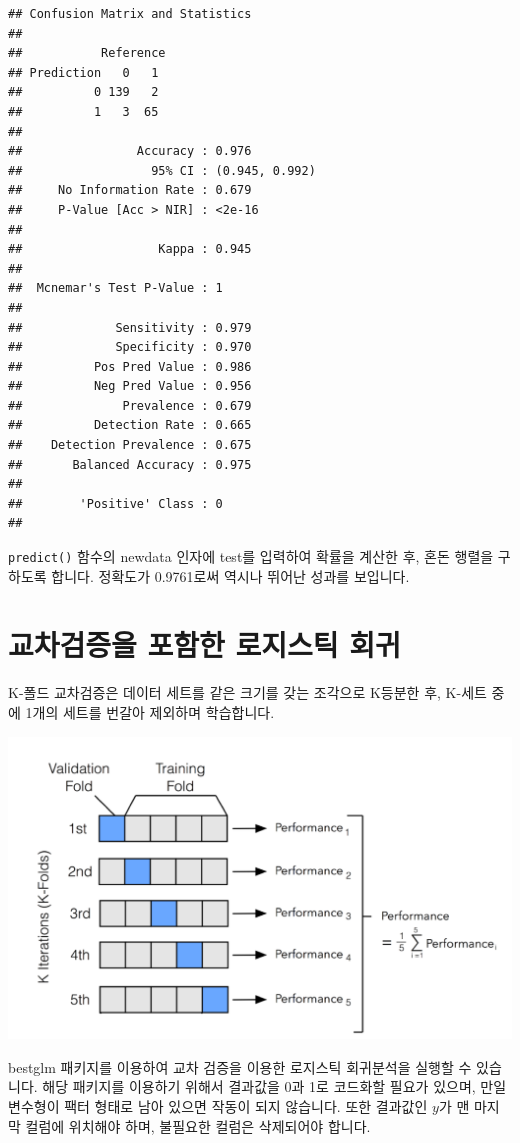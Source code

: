 \documentclass[12pt,]{book}
\begin{document}
\begin{verbatim}
## Confusion Matrix and Statistics
## 
##           Reference
## Prediction   0   1
##          0 139   2
##          1   3  65
##                                         
##                Accuracy : 0.976         
##                  95% CI : (0.945, 0.992)
##     No Information Rate : 0.679         
##     P-Value [Acc > NIR] : <2e-16        
##                                         
##                   Kappa : 0.945         
##                                         
##  Mcnemar's Test P-Value : 1             
##                                         
##             Sensitivity : 0.979         
##             Specificity : 0.970         
##          Pos Pred Value : 0.986         
##          Neg Pred Value : 0.956         
##              Prevalence : 0.679         
##          Detection Rate : 0.665         
##    Detection Prevalence : 0.675         
##       Balanced Accuracy : 0.975         
##                                         
##        'Positive' Class : 0             
## 
\end{verbatim}

\texttt{predict()} 함수의 newdata 인자에 test를 입력하여 확률을 계산한 후, 혼돈 행렬을 구하도록 합니다. 정확도가 0.9761로써 역시나 뛰어난 성과를 보입니다.

\hypertarget{uxad50uxcc28uxac80uxc99duxc744-uxd3ecuxd568uxd55c-uxb85cuxc9c0uxc2a4uxd2f1-uxd68cuxadc0}{%
\section{교차검증을 포함한 로지스틱 회귀}\label{uxad50uxcc28uxac80uxc99duxc744-uxd3ecuxd568uxd55c-uxb85cuxc9c0uxc2a4uxd2f1-uxd68cuxadc0}}

K-폴드 교차검증은 데이터 세트를 같은 크기를 갖는 조각으로 K등분한 후, K-세트 중에 1개의 세트를 번갈아 제외하며 학습합니다.

\begin{center}\includegraphics[width=0.5\linewidth]{images/kfolds} \end{center}

bestglm 패키지를 이용하여 교차 검증을 이용한 로지스틱 회귀분석을 실행할 수 있습니다. 해당 패키지를 이용하기 위해서 결과값을 0과 1로 코드화할 필요가 있으며, 만일 변수형이 팩터 형태로 남아 있으면 작동이 되지 않습니다. 또한 결과값인 \(y\)가 맨 마지막 컬럼에 위치해야 하며, 불필요한 컬럼은 삭제되어야 합니다.
\end{document}
